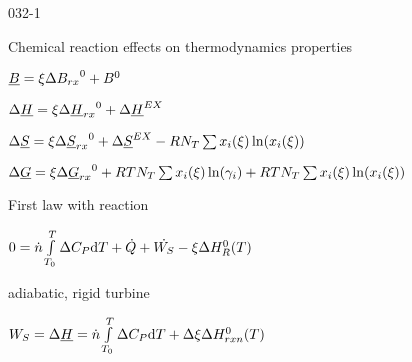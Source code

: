 \begin{mitframe}{032-1}


\begin{listone}

	\item Chemical reaction effects on thermodynamics properties
    
    \begin{listtwo}

		\item $\uline{\exergy}=\extent\iipf{\exergy_{rx}}^{\init}+\exergy^{\init}$
        
        \item $\iipf\uline{\enthalpy}=\extent\iipf{\uline{\enthalpy}_{rx}}^{\init}+\iipf\uline{\enthalpy}^{\exfunc}$
        
        \item $\iipf\uline{\entropy}=\extent\iipf{\uline{\entropy}_{rx}}^{\init}+\iipf\uline{\entropy}^{\exfunc}-\gasconst\nummoles_{\Temp}\sum\specfrac{i}(\extent)\ln(\specfrac{i}(\extent))$
        
        \item $\iipf\uline{\gibbs}=\extent\iipf{\uline{\gibbs}_{rx}}^{\init}+\gasconst\Temp\nummoles_{\Temp}\sum\specfrac{i}(\extent)\ln(\actcoeff)+\gasconst\Temp\nummoles_{\Temp}\sum\specfrac{i}(\extent)\ln(\specfrac{i}(\extent))$

	\end{listtwo}
    
    \item First law with reaction
        
    \begin{listtwo}

		\item $0 = \dot{n}\int\limits_{\Temp_{\init}}^{\Temp}\iipf\cp\mathrm{d}\Temp+\dot{\heatflow}+\dot{\work_{\entropy}}-\extent\iipf\enthalpy_{\gasconst}^{\init}(\Temp)$
        
        \item adiabatic, rigid turbine

	\end{listtwo}   
    
    \item $\work_{\entropy}=\iipf\uline{\enthalpy}=\dot{n}\int\limits_{\Temp_{\init}}^{\Temp}\iipf\cp\mathrm{d}\Temp+\iipf\extent\iipf\enthalpy_{rxn}^{\init}(\Temp)$
    
\end{listone}

\end{mitframe}